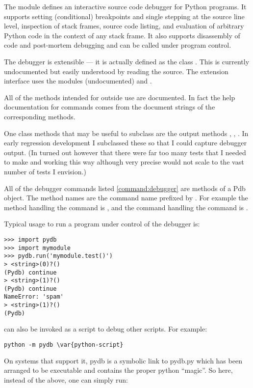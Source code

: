 The module  defines an interactive source code
debugger for Python programs.  It supports setting
(conditional) breakpoints and single stepping at the source line
level, inspection of stack frames, source code listing, and evaluation
of arbitrary Python code in the context of any stack frame.  It also
supports disassembly of code and post-mortem debugging and can be
called under program control.

The debugger is extensible --- it is actually defined as the class
.
This is currently undocumented but easily understood by reading the
source.  The extension interface uses the modules
 (undocumented) and
.

All of the methods intended for outside use are documented. In fact
the help documentation for commands comes from the document strings of
the corresponding methods.

One class methods that may be useful to subclass are the output
methods , , . In early
regression development I subclassed these so that I could capture
debugger output. (In turned out however that there were far too many
tests that I needed to make and working this way although very precise
would not scale to the vast number of tests I envision.)

All of the debugger commands listed \ref{command:debugger} are methods
of a Pdb object. The method names are the command name prefixed by
. For example the method handling the  command is
, and the command handling the  command is
. 

Typical usage to run a program under control of the debugger is:

\begin{verbatim}
>>> import pydb
>>> import mymodule
>>> pydb.run('mymodule.test()')
> <string>(0)?()
(Pydb) continue
> <string>(1)?()
(Pydb) continue
NameError: 'spam'
> <string>(1)?()
(Pydb) 
\end{verbatim}

 can also be invoked as
a script to debug other scripts.  For example:

\begin{verbatim}
python -m pydb \var{python-script}
\end{verbatim}

On systems that support it, pydb is a symbolic link to pydb.py which
has been arranged to be executable and contains the proper python
``magic''. So here, instead of the above, one can simply run:

